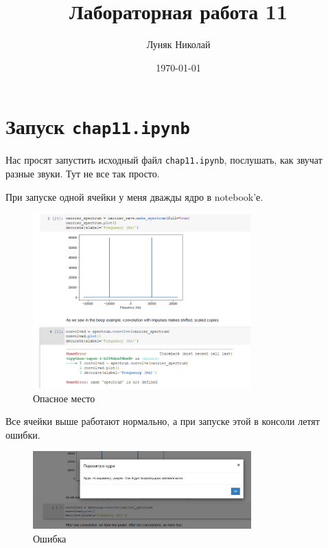 \documentclass[a4paper,12pt]{report}
\author{Луняк Николай}
\title{Лабораторная работа 11}
\date{\today}
\begin{document}
    \maketitle
    \tableofcontents
    \listoffigures
    \lstlistoflistings
    
    \chapter{Запуск \texttt{chap11.ipynb}}
    
    Нас просят запустить исходный файл \texttt{chap11.ipynb}, послушать, как звучат разные звуки. Тут не все так просто. 
    
    При запуске одной ячейки у меня дважды  ядро в notebook'е.
    
    \begin{figure}[H]
        \centering
        \includegraphics[width=0.75\textwidth]{images/ex1_dangerous.png}
        \caption{Опасное место}
        \label{fig:ex1_dangerous}
    \end{figure}
    
    Все ячейки выше работают нормально, а при запуске этой в консоли летят ошибки. 
    
    \begin{figure}[H]
        \centering
        \includegraphics[width=0.75\textwidth]{images/ex1_error.png}
        \caption{Ошибка}
        \label{fig:ex1_error}
    \end{figure}
    
\end{document}
